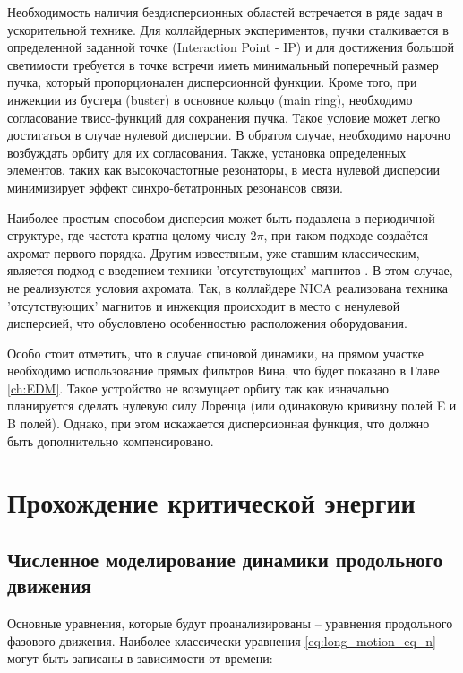 \par Необходимость наличия бездисперсионных областей встречается в ряде задач в ускорительной технике. Для коллайдерных экспериментов, пучки сталкивается в определенной заданной точке (Interaction Point - IP) и для достижения большой светимости требуется в точке встречи иметь минимальный поперечный размер пучка, который пропорционален дисперсионной функции. Кроме того, при инжекции из бустера (buster) в основное кольцо (main ring), необходимо согласование твисс-функций для сохранения пучка. Такое условие может легко достигаться в случае нулевой дисперсии. В обратом случае, необходимо нарочно возбуждать орбиту для их согласования. Также, установка определенных элементов, таких как высокочастотные резонаторы, в места нулевой дисперсии минимизирует эффект синхро-бетатронных резонансов связи.

\par Наиболее простым способом дисперсия может быть подавлена в периодичной структуре, где частота кратна целому числу $2\pi$, при таком подходе создаётся ахромат первого порядка. Другим извествным, уже ставшим классическим, является подход с введением техники 'отсутствующих' магнитов \cite{autin:dispersion}. В этом случае, не реализуются условия ахромата. Так, в коллайдере NICA реализована техника 'отсутствующих' магнитов и инжекция происходит в место с ненулевой дисперсией, что обусловлено особенностью расположения оборудования.

\par Особо стоит отметить, что в случае спиновой динамики, на прямом участке необходимо использование прямых фильтров Вина, что будет показано в Главе \ref{ch:EDM}. Такое устройство не возмущает орбиту так как изначально планируется сделать нулевую силу Лоренца (или одинаковую кривизну полей E и B полей). Однако, при этом искажается дисперсионная функция, что должно быть дополнительно компенсировано.

	
	\section{Прохождение критической энергии}\label{sec:transition_jump/U-70}
	
	\subsection{Численное моделирование динамики продольного движения} \label{sec:transition_jump/modeling}
	
\par Основные уравнения, которые будут проанализированы – уравнения продольного фазового движения.
Наиболее классически уравнения \ref{eq:long_motion_eq_n} могут быть записаны в зависимости от времени:
	
